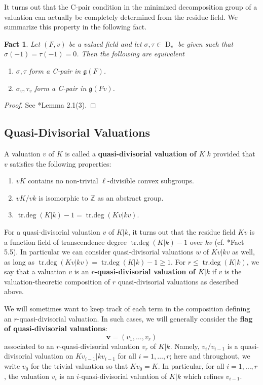 \documentclass[11pt]{amsart}
\newtheorem{fact}[proposition]{Fact}
\theoremstyle{definition}
\theoremstyle{remark}
\numberwithin{equation}{section}
\DeclareMathOperator{\trdeg}{tr.deg}
\DeclareMathOperator{\D}{D}
\newcommand{\Z}{\mathbb{Z}}
\newcommand{\vbf}{\mathbf{v}}
\newcommand{\gfrak}{\mathfrak{g}}
\begin{document}
It turns out that the C-pair condition in the minimized decomposition group of a valuation can actually be completely determined from the residue field.
We summarize this property in the following fact.

\begin{fact}
\label{fact: localthy / mindec / c-pair-mindec}
  Let $(F,v)$ be a valued field and let $\sigma,\tau \in \D_v$ be given such that $\sigma(-1)=\tau(-1) = 0$.
  Then the following are equivalent
  \begin{enumerate}
    \item $\sigma,\tau$ form a C-pair in $\gfrak(F)$.
    \item $\sigma_v,\tau_v$ form a C-pair in $\gfrak(Fv)$.
  \end{enumerate}
\end{fact}
\begin{proof}
  See \cite{Topaz:2015}*{Lemma 2.1(3)}.
\end{proof}

\subsection{Quasi-Divisorial Valuations}
\label{subsection: localthy / qpd}

A valuation $v$ of $K$ is called a {\bf quasi-divisorial valuation of $K|k$} provided that $v$ satisfies the following properties:
\begin{enumerate}
  \item $vK$ contains no non-trivial $\ell$-divisible convex subgroups.
  \item $vK/vk$ is isomorphic to $\Z$ as an abstract group.
  \item $\trdeg(K|k)-1 = \trdeg(Kv|kv)$.
\end{enumerate}
For a quasi-divisorial valuation $v$ of $K|k$, it turns out that the residue field $Kv$ is a function field of transcendence degree $\trdeg(K|k)-1$ over $kv$ (cf. \cite{Pop:2006}*{Fact 5.5}).
In particular we can consider quasi-divisorial valuations $w$ of $Kv|kv$ as well, as long as $\trdeg(Kv|kv) = \trdeg(K|k)-1 \geq 1$.
For $r \leq \trdeg(K|k)$, we say that a valuation $v$ is an {\bf $r$-quasi-divisorial valuation of $K|k$} if $v$ is the valuation-theoretic composition of $r$ quasi-divisorial valuations as described above.

We will sometimes want to keep track of each term in the composition defining an $r$-quasi-divisorial valuation.
In such cases, we will generally consider the {\bf flag of quasi-divisorial valuations}:
\[ \vbf = (v_1,\ldots,v_r) \]
associated to an $r$-quasi-divisorial valuation $v_r$ of $K|k$.
Namely, $v_i/v_{i-1}$ is a quasi-divisorial valuation on $Kv_{i-1}|kv_{i-1}$ for all $i = 1,\ldots,r$; here and throughout, we write $v_0$ for the trivial valuation so that $Kv_0 = K$.
In particular, for all $i =1,\ldots,r$, the valuation $v_i$ is an $i$-quasi-divisorial valuation of $K|k$ which refines $v_{i-1}$.
\end{document}
